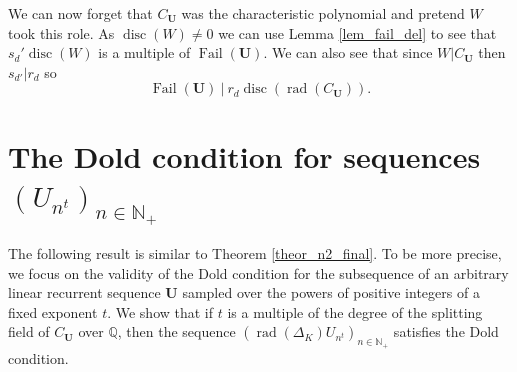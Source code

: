 \documentclass[preprint,12pt]{elsarticle}
\newcommand{\N}{\mathbb{N}}
\newcommand{\Q}{\mathbb{Q}}
\DeclareMathOperator{\rad}{rad}
\DeclareMathOperator{\fail}{Fail}
\DeclareMathOperator{\disc}{disc}
\begin{document}
We can now forget that $C_\mathbf{U}$ was the characteristic polynomial and pretend $W$ took this role. As $\disc(W) \not= 0$ we can use Lemma \ref{lem_fail_del} to see that $s_d'\disc(W)$ is a multiple of $\fail(\mathbf{U})$. We can also see that since $W|C_\mathbf{U}$ then $s_{d'}|r_d$ so
$$\fail(\mathbf{U})\ |\ r_d\disc(\rad(C_\mathbf{U})). $$




\section{The Dold condition for sequences $({U}_{n^t})_{n\in\N_+}$}


The following result is similar to Theorem \ref{theor_n2_final}. To be more precise, we focus on the validity of the Dold condition for the subsequence of an arbitrary linear recurrent sequence $\textbf{U}$ sampled over the powers of positive integers of a fixed exponent $t$. We show that if $t$ is a multiple of the degree of the splitting field of $C_{\textbf{U}}$ over $\Q$, then the sequence $(\rad(\Delta_K) {U}_{n^t})_{n\in\N_+}$ satisfies the Dold condition.
\end{document}
